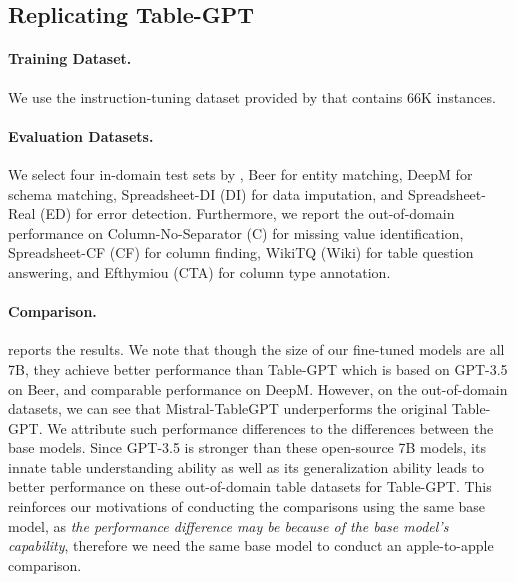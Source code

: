 \documentclass[11pt]{article}
\begin{document}
\subsection{Replicating Table-GPT}
\label{subsec: mistral-tablegpt}


\paragraph{Training Dataset.}
We use the instruction-tuning dataset provided by \citet{li2023table} that contains 66K instances.

\paragraph{Evaluation Datasets.}
We select four in-domain test sets by \citet{li2023table}, Beer for entity matching, DeepM for schema matching, Spreadsheet-DI (DI) for data imputation, and Spreadsheet-Real (ED) for error detection.
Furthermore, we report the out-of-domain performance on Column-No-Separator (C) for missing value identification, Spreadsheet-CF (CF) for column finding, WikiTQ (Wiki) for table question answering, and Efthymiou (CTA) for column type annotation.

\paragraph{Comparison.}

 reports the results.
We note that though the size of our fine-tuned models are all 7B, they achieve better performance than Table-GPT which is based on GPT-3.5 on Beer, and comparable performance on DeepM.
However, on the out-of-domain datasets, we can see that Mistral-TableGPT underperforms the original Table-GPT.
We attribute such performance differences to the differences between the base models.
Since GPT-3.5 is stronger than these open-source 7B models, its innate table understanding ability as well as its generalization ability leads to better performance on these out-of-domain table datasets for Table-GPT.
This reinforces our motivations of conducting the comparisons using the same base model, as \textit{the performance difference may be because of the base model's capability}, therefore we need the same base model to conduct an apple-to-apple comparison.
\end{document}

